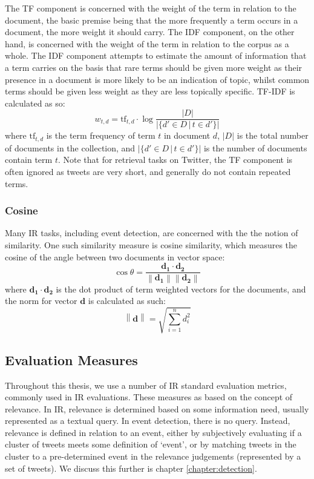 The TF component is concerned with the weight of the term in relation to the document, the basic premise being that the more frequently a term occurs in a document, the more weight it should carry.
The IDF component, on the other hand, is concerned with the weight of the term in relation to the corpus as a whole.
The IDF component attempts to estimate the amount of information that a term carries on the basis that rare terms should be given more weight as their presence in a document is more likely to be an indication of topic, whilst common terms should be given less weight as they are less topically specific.
TF-IDF is calculated as so:
\begin{displaymath}
	w_{t,d} = \mathrm{tf}_{t,d} \cdot \log{\frac{|D|}{|\{d' \in D \, | \, t \in d'\}|}}
\end{displaymath}
where \(\mathrm{tf}_{t,d}\) is the term frequency of term \(t\) in document \(d\), \(|D|\) is the total number of documents in the collection, and \(|\{d' \in D \, | \, t \in d'\}|\) is the number of documents contain term \(t\).
Note that for retrieval tasks on Twitter, the TF component is often ignored as tweets are very short, and generally do not contain repeated terms.

\subsubsection{Cosine}

Many IR tasks, including event detection, are concerned with the the notion of similarity.
One such similarity measure is cosine similarity, which measures the cosine of the angle between two documents in vector space:
\begin{displaymath}
	\cos{\theta} = \frac{\mathbf{d_1} \cdot \mathbf{d_2}}{\left\| \mathbf{d_1} \right\| \left \| \mathbf{d_2} \right\|}
\end{displaymath}
where \(\mathbf{d_1} \cdot \mathbf{d_2}\) is the dot product of term weighted vectors for the documents, and the norm for vector \(\mathbf{d}\) is calculated as such:
\begin{displaymath}
	\left\| \mathbf{d} \right\| = \sqrt{\sum_{i=1}^n d_i^2}
\end{displaymath}

\subsection{Evaluation Measures}
Throughout this thesis, we use a number of IR standard evaluation metrics, commonly used in IR evaluations.
These measures as based on the concept of relevance.
In IR, relevance is determined based on some information need, usually represented as a textual query.
In event detection, there is no query.
Instead, relevance is defined in relation to an event, either by subjectively evaluating if a cluster of tweets meets some definition of `event', or by matching tweets in the cluster to a pre-determined event in the relevance judgements (represented by a set of tweets).
We discuss this further is chapter \ref{chapter:detection}.


